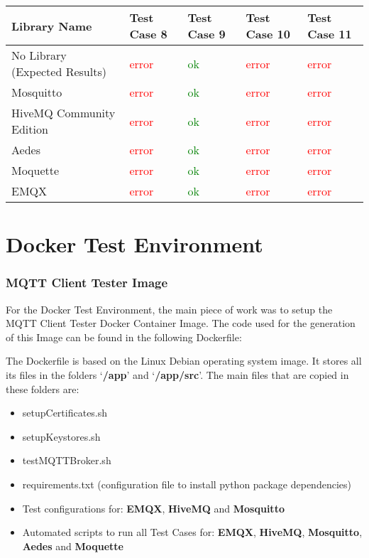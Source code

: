 \documentclass[binding=0.6cm,noexaminfo]{sapthesis}
\begin{document}
\begin{flushleft}
\begin{tabular}{| p{2cm} | p{1.5cm} | p{1.5cm} | p{1.5cm} | p{1.5cm} |}
\hline
\bf Library Name & \bf Test Case 8 & \bf Test Case 9 & \bf Test Case 10 & \bf Test Case 11 \\
\hline
No Library (Expected Results) & \textcolor{red}{error} & \textcolor{green}{ok} & \textcolor{red}{error} & \textcolor{red}{error} \\
\hline
Mosquitto & \textcolor{red}{error} & \textcolor{green}{ok} & \textcolor{red}{error} & \textcolor{red}{error} \\
\hline
HiveMQ Community Edition & \textcolor{red}{error} & \textcolor{green}{ok} & \textcolor{red}{error} & \textcolor{red}{error} \\
\hline
Aedes & \textcolor{red}{error} & \textcolor{green}{ok} & \textcolor{red}{error} & \textcolor{red}{error} \\
\hline
Moquette & \textcolor{red}{error} & \textcolor{green}{ok} & \textcolor{red}{error} & \textcolor{red}{error} \\
\hline
EMQX & \textcolor{red}{error} & \textcolor{green}{ok} & \textcolor{red}{error} & \textcolor{red}{error} \\
\hline
\end{tabular}
\end{flushleft}

\chapter{Docker Test Environment}
\subsection{MQTT Client Tester Image}
For the Docker Test Environment, the main piece of work was to setup the MQTT Client Tester Docker Container Image. The code used for the generation of this Image can be found in the following Dockerfile:


The Dockerfile is based on the Linux Debian operating system image. It stores all its files in the folders `\textbf{/app}' and `\textbf{/app/src}'. The main files that are copied in these folders are:
\begin{itemize}
	\item setupCertificates.sh
	\item setupKeystores.sh
	\item testMQTTBroker.sh
	\item requirements.txt (configuration file to install python package dependencies)
	\item Test configurations for: \textbf{EMQX}, \textbf{HiveMQ} and \textbf{Mosquitto}
	\item Automated scripts to run all Test Cases for: \textbf{EMQX}, \textbf{HiveMQ}, \textbf{Mosquitto}, \textbf{Aedes} and \textbf{Moquette}
\end{itemize}
\end{document}
